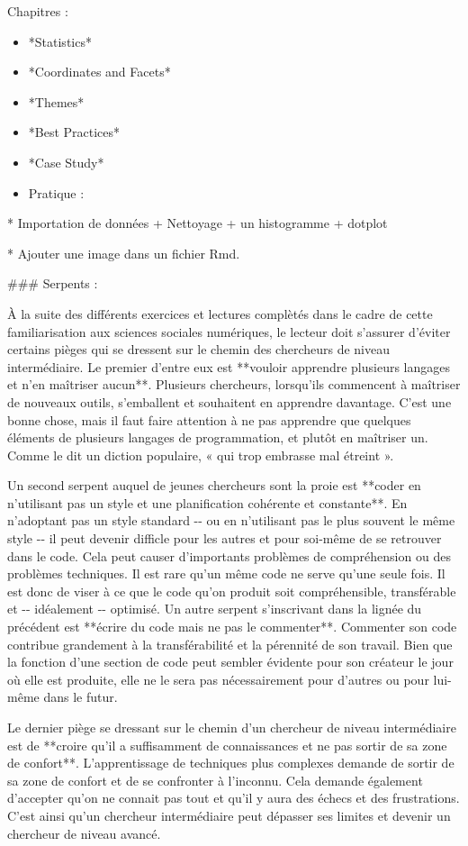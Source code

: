 \documentclass[
  letterpaper,
]{scrbook}
\begin{document}
Chapitres :

\begin{itemize}
\item
  *Statistics*
\item
  *Coordinates and Facets*
\item
  *Themes*
\item
  *Best Practices*
\item
  *Case Study*
\item
  Pratique :
\end{itemize}

* Importation de données + Nettoyage + un histogramme + dotplot

* Ajouter une image dans un fichier Rmd.

\#\#\# Serpents :

À la suite des différents exercices et lectures complètés dans le cadre
de cette familiarisation aux sciences sociales numériques, le lecteur
doit s'assurer d'éviter certains pièges qui se dressent sur le chemin
des chercheurs de niveau intermédiaire. Le premier d'entre eux est
**vouloir apprendre plusieurs langages et n'en maîtriser aucun**.
Plusieurs chercheurs, lorsqu'ils commencent à maîtriser de nouveaux
outils, s'emballent et souhaitent en apprendre davantage. C'est une
bonne chose, mais il faut faire attention à ne pas apprendre que
quelques éléments de plusieurs langages de programmation, et plutôt en
maîtriser un. Comme le dit un diction populaire, « qui trop embrasse mal
étreint ».

Un second serpent auquel de jeunes chercheurs sont la proie est **coder
en n'utilisant pas un style et une planification cohérente et
constante**. En n'adoptant pas un style standard -\/- ou en n'utilisant
pas le plus souvent le même style -\/- il peut devenir difficle pour les
autres et pour soi-même de se retrouver dans le code. Cela peut causer
d'importants problèmes de compréhension ou des problèmes techniques. Il
est rare qu'un même code ne serve qu'une seule fois. Il est donc de
viser à ce que le code qu'on produit soit compréhensible, transférable
et -\/- idéalement -\/- optimisé. Un autre serpent s'inscrivant dans la
lignée du précédent est **écrire du code mais ne pas le commenter**.
Commenter son code contribue grandement à la transférabilité et la
pérennité de son travail. Bien que la fonction d'une section de code
peut sembler évidente pour son créateur le jour où elle est produite,
elle ne le sera pas nécessairement pour d'autres ou pour lui-même dans
le futur.

Le dernier piège se dressant sur le chemin d'un chercheur de niveau
intermédiaire est de **croire qu'il a suffisamment de connaissances et
ne pas sortir de sa zone de confort**. L'apprentissage de techniques
plus complexes demande de sortir de sa zone de confort et de se
confronter à l'inconnu. Cela demande également d'accepter qu'on ne
connait pas tout et qu'il y aura des échecs et des frustrations. C'est
ainsi qu'un chercheur intermédiaire peut dépasser ses limites et devenir
un chercheur de niveau avancé.
\end{document}
